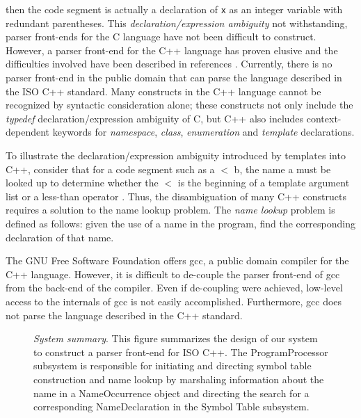 \noindent
then the code segment is actually a declaration of {\tt x}
as an integer variable with redundant parentheses.
This {\em declaration/expression ambiguity}
not withstanding, parser front-ends for the
C language have not been difficult to construct.
However, a parser front-end for
the C++ language has proven elusive and 
the difficulties involved have been described in 
references \cite{bodin94,knapen99,lilley97,power00,reiss95,Roskind89}.
Currently, there is no parser front-end in the public domain
that can parse the language described in the ISO C++
standard\cite{C++standard98}. 
Many constructs in the C++ language cannot be recognized by
syntactic consideration alone;
these constructs
not only include the {\em typedef} declaration/expression
ambiguity of C, but C++ also includes context-dependent keywords
for {\em namespace}, {\em class}, {\em enumeration} and {\em template}
declarations\cite[Appendix A]{C++standard98}. 

To illustrate the declaration/expression ambiguity introduced 
by templates into C++,
consider that for a code segment such as {\sf a} $<$ {\sf b},
the name {\sf a} must be looked up to determine
whether the $<$ is the beginning of a template
argument list or a less-than 
operator \cite[\S 3.4.5/1]{C++standard98}.
Thus, the disambiguation of many C++ constructs
requires a solution to the name lookup problem.
The {\em name lookup} problem is defined as follows:
given the use of a name in the program, find the
corresponding declaration of that name.

The GNU Free Software Foundation
offers {\sf gcc},
a public domain compiler for the C++ language.
However, it is difficult to de-couple the parser front-end 
of {\sf gcc} from the back-end of the compiler.
Even if de-coupling were achieved, low-level access to
the internals of {\sf gcc} is not easily accomplished.
Furthermore, {\sf gcc} does not parse the language described
in the C++ standard.


\begin{figure*}[t]
 \centerline{\protect
\mbox{}}
  \caption{{\em System summary}.
This figure summarizes the design of our system
to construct a parser front-end for ISO C++.
The {\sf ProgramProcessor} subsystem is responsible
for initiating and directing symbol table construction
and name lookup by marshaling information about the name in a
{\sf NameOccurrence} object and directing the search for
a corresponding {\sf NameDeclaration} in
the {\sf Symbol Table} subsystem.
}
   \label{fig:sysoverview}
\figline
\end{figure*}


